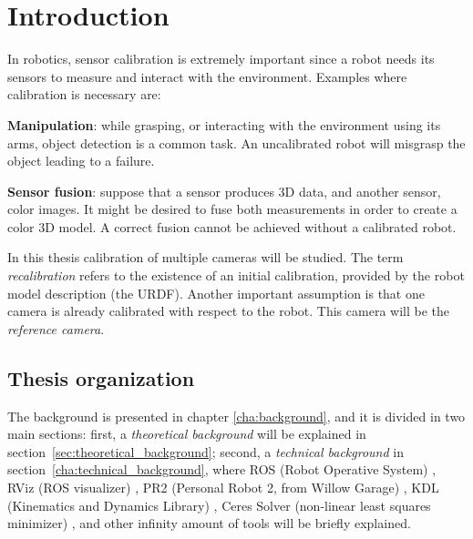 \chapter{Introduction}
\label{cha:intro}

\vspace*{-2ex}
In robotics, sensor calibration is extremely important since a robot needs its sensors to measure and interact with the environment.
Examples where calibration is necessary are:
\begin{itemize*}
 \item \textbf{Manipulation}: while grasping, or interacting with the environment using its arms, object detection is a common task. An uncalibrated robot will misgrasp the object leading to a failure.

 \item \textbf{Sensor fusion}: suppose that a sensor produces 3D data, and another sensor, color images. It might be desired to fuse both measurements in order to create a color 3D model. A correct fusion cannot be achieved without a calibrated robot.
\end{itemize*}

\noindent
In this thesis calibration of multiple cameras will be studied. The term \textit{recalibration} refers to the existence of an initial calibration, provided by the robot model description (the URDF). Another important assumption is that one camera is already calibrated with respect to the robot. This camera will be the \textit{reference camera}.


\vspace*{-2ex}
\section{Thesis organization} %

The background is presented in chapter \ref{cha:background}, and it is divided in two main sections: first, a \textit{theoretical background} will be explained in section~\ref{sec:theoretical_background}; second, a \textit{technical background} in section~\ref{cha:technical_background}, where ROS (Robot Operative System) \cite{ROS}, RViz (ROS visualizer) \cite{RViz}, PR2 (Personal Robot 2, from Willow Garage) \cite{PR2}, KDL (Kinematics and Dynamics Library) \cite{KDL}, Ceres Solver (non-linear least squares minimizer) \cite{ceres}, and other infinity amount of tools will be briefly explained.

